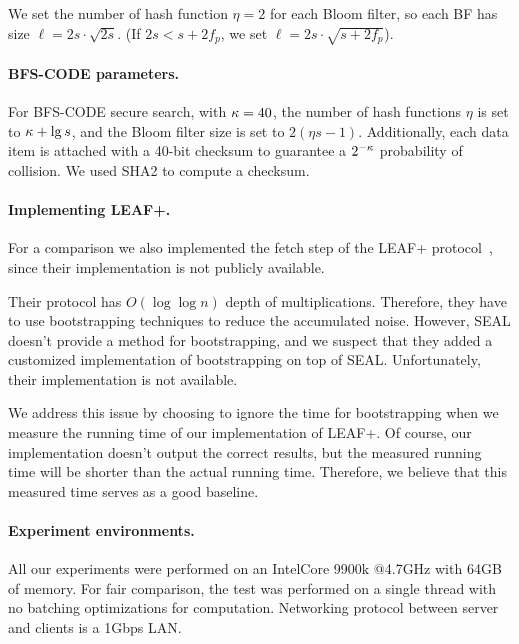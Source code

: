 \item We set the number of hash function $\eta=2$ for each Bloom filter, so
  each BF has size $\ell = 2s \cdot \sqrt{2s}$. (If $2s < s + 2f_p$, we set
  $\ell = 2s \cdot \sqrt{s + 2f_p}$). 
\EI

\paragraph{BFS-CODE parameters.}
For BFS-CODE secure search, with $\kappa = 40$, the number of
hash functions $\eta$ is set to $\kappa+\lg{s}$, and the Bloom filter
size is set to $2(\eta s - 1)$. 
%
Additionally, each data item is attached with a 40-bit checksum to
guarantee a $2^{-\kappa}$ probability of collision. We used SHA2 to
compute a checksum.   

\paragraph{Implementing LEAF+.}
For a comparison we also implemented the fetch step of the LEAF+
protocol~\cite{CCS:WYXZ20}, since their implementation is not publicly available.

Their protocol has $O(\log \log n)$ depth of multiplications. Therefore, they
have to use bootstrapping techniques to reduce the accumulated noise.
However, SEAL doesn't provide a method for bootstrapping, and we suspect
that they added a customized implementation of bootstrapping on top of
SEAL. Unfortunately, their implementation is not available. 

We address this issue by choosing to ignore the time for bootstrapping
when we measure the running time of our implementation of LEAF+. Of
course, our implementation doesn't output the correct results, but the
measured running time will be shorter than the actual running time.
Therefore, we believe that this measured time serves as a good baseline.  

\paragraph{Experiment environments.}
All our experiments were performed on an Intel\textregistered Core 9900k
@4.7GHz with 64GB of memory. For fair comparison, the test was performed
on a single thread with no batching optimizations for computation.
Networking protocol between server and clients is a 1Gbps LAN.

